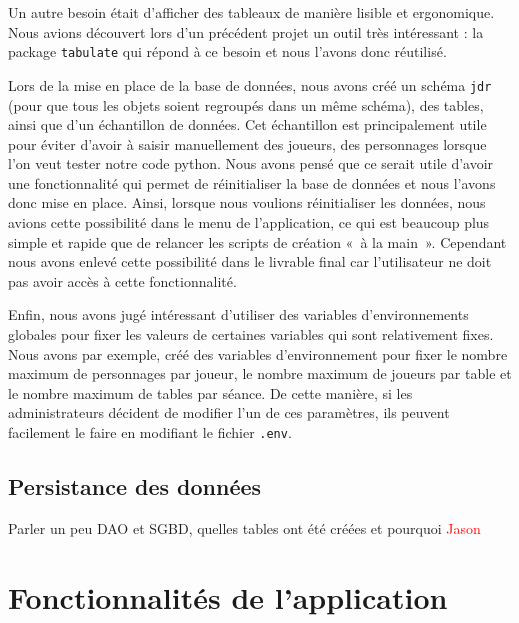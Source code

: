 \documentclass[11pt]{article}
\begin{document}
\bigbreak

Un autre besoin était d'afficher des tableaux de manière lisible et ergonomique. Nous avions découvert lors d'un précédent projet un outil très intéressant : la package \texttt{tabulate} qui répond à ce besoin et nous l'avons donc réutilisé.

\bigbreak

Lors de la mise en place de la base de données, nous avons créé un schéma \texttt{jdr} (pour que tous les objets soient regroupés dans un même schéma), des tables, ainsi que d'un échantillon de données. Cet échantillon est principalement utile pour éviter d'avoir à saisir manuellement des joueurs, des personnages lorsque l'on veut tester notre code python. Nous avons pensé que ce serait utile d'avoir une fonctionnalité qui permet de réinitialiser la base de données et nous l'avons donc mise en place. 
Ainsi, lorsque nous voulions réinitialiser les données, nous avions cette possibilité dans le menu de l'application, ce qui est beaucoup plus simple et rapide que de relancer les scripts de création «~à la main~». Cependant nous avons enlevé cette possibilité dans le livrable final car l'utilisateur ne doit pas avoir accès à cette fonctionnalité.

\bigbreak

Enfin, nous avons jugé intéressant d'utiliser des variables d'environnements globales pour fixer les valeurs de certaines variables qui sont relativement fixes. Nous avons par exemple, créé des variables d'environnement pour fixer le nombre maximum de personnages par joueur, le nombre maximum de joueurs par table et le nombre maximum de tables par séance. De cette manière, si les administrateurs décident de modifier l'un de ces paramètres, ils peuvent facilement le faire en modifiant le fichier \texttt{.env}.



\subsection{Persistance des données}

Parler un peu DAO et SGBD, quelles tables ont été créées et pourquoi
\textcolor{red}{Jason}


\newpage
\section{Fonctionnalités de l'application}
\end{document}
